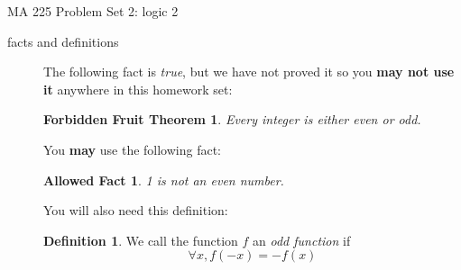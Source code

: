 \documentclass{letter}
\newtheorem*{theorem*}{Forbidden Fruit Theorem}
\newtheorem*{allowed}{Allowed Fact}
\theoremstyle{definition}
\newtheorem*{definition}{Definition}
\begin{document}
\pagestyle{empty}

{\Large MA 225 Problem Set 2: logic 2}\\


\begin{description}
\item[facts and definitions] The following fact is {\em true}, but we have not proved it so you {\bfseries may not use it} anywhere in this homework set:
\begin{theorem*}
	Every integer is either even or odd.
\end{theorem*}

You {\bfseries may} use the following fact:
\begin{allowed}
	1 is not an even number.
\end{allowed}

You will also need this definition:
\begin{definition}
	We call the function $f$ an {\em odd function} if $$\forall x, f(-x)=-f(x)$$  
	

\end{definition}
\end{description}
\end{document}
